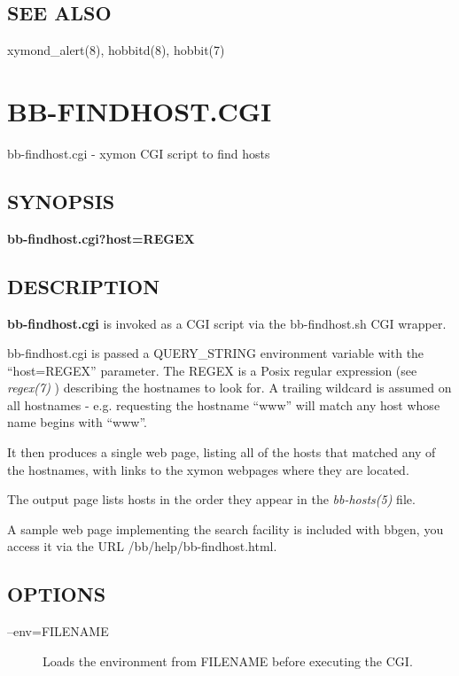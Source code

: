 \subsection{SEE ALSO}
xymond\_alert(8), hobbitd(8), hobbit(7) 

 
%
\newpage
\section{BB-FINDHOST.CGI}

 bb-findhost.cgi - xymon CGI script to find hosts

\subsection{SYNOPSIS}
\textbf{bb-findhost.cgi?host=REGEX}


 
\subsection{DESCRIPTION}
\textbf{bb-findhost.cgi}
 is invoked as a CGI script via the bb-findhost.sh CGI wrapper. 

  bb-findhost.cgi is passed a QUERY\_STRING environment variable with
  the ``host=REGEX'' parameter. The REGEX is a Posix regular
  expression (see \emph{regex(7)} ) describing the hostnames to look
  for. A trailing wildcard is assumed on all hostnames -
  e.g. requesting the hostname ``www'' will match any host whose name
  begins with ``www''. 

  It then produces a single web page, listing all of the hosts that
  matched any of the hostnames, with links to the xymon webpages
  where they are located. 

  The output page lists hosts in the order they appear in the
  \emph{bb-hosts(5)} file. 



  A sample web page implementing the search facility is included with
  bbgen, you access it via the URL /bb/help/bb-findhost.html. 



 
\subsection{OPTIONS}
\begin{description}
\item[--env=FILENAME] Loads the environment from FILENAME before executing the CGI. 

 


\end{description}
